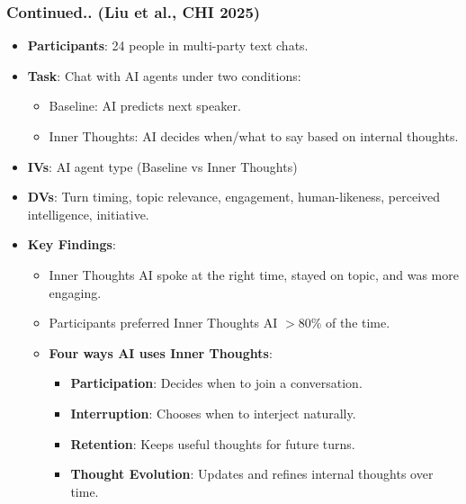 \documentclass{beamer}
\begin{document}
\begin{frame}
    \frametitle{Continued.. (Liu et al., CHI 2025)}
    \scriptsize
    \begin{itemize}
        \item \textbf{Participants}: 24 people in multi-party text chats.
        \item \textbf{Task}: Chat with AI agents under two conditions:
        \begin{itemize}
            \scriptsize
            \item Baseline: AI predicts next speaker.
            \item Inner Thoughts: AI decides when/what to say based on internal thoughts.
        \end{itemize}
        \item \textbf{IVs}: AI agent type (Baseline vs Inner Thoughts)
        \item \textbf{DVs}: Turn timing, topic relevance, engagement, human-likeness, perceived intelligence, initiative.
        \item \textbf{Key Findings}:
        \begin{itemize}
            \scriptsize
            \item Inner Thoughts AI spoke at the right time, stayed on topic, and was more engaging.
            \item Participants preferred Inner Thoughts AI $>$80\% of the time.
            \item \textbf{Four ways AI uses Inner Thoughts}:
            \begin{itemize}
                \scriptsize
                \item \textbf{Participation}: Decides when to join a conversation.
                \item \textbf{Interruption}: Chooses when to interject naturally.
                \item \textbf{Retention}: Keeps useful thoughts for future turns.
                \item \textbf{Thought Evolution}: Updates and refines internal thoughts over time.
            \end{itemize}
        \end{itemize}
    \end{itemize}
\end{frame}
\end{document}
